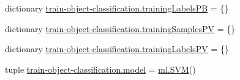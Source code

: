 \begin{DoxyCompactItemize}
\item 
dictionary \hyperlink{namespacetrain-object-classification_aef8b43602eb95d856f8e5ca31bd77473}{train-\/object-\/classification.\-training\-Labels\-P\-B} = \{\}
\item 
dictionary \hyperlink{namespacetrain-object-classification_a0f1db4b15cd5640a02d76f4940b82080}{train-\/object-\/classification.\-training\-Samples\-P\-V} = \{\}
\item 
dictionary \hyperlink{namespacetrain-object-classification_a26307da540e6600d0314876308f6d9f0}{train-\/object-\/classification.\-training\-Labels\-P\-V} = \{\}
\item 
tuple \hyperlink{namespacetrain-object-classification_a2460fc9486a03f588e9583a3d4969607}{train-\/object-\/classification.\-model} = \hyperlink{classml_1_1SVM}{ml.\-S\-V\-M}()
\end{DoxyCompactItemize}
